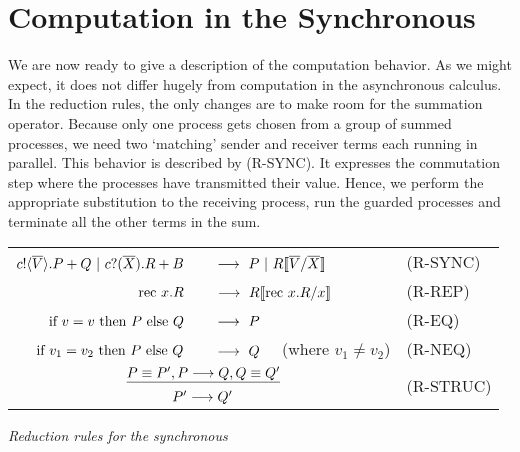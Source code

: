 \section{Computation in the Synchronous \Picalc}
We are now ready to give a description of the computation behavior.  
As we might expect, it does not differ hugely from computation in the asynchronous calculus.  
In the reduction rules, the only changes are to make room for the summation operator.
Because only one process gets chosen from a group of summed processes, we need two `matching' sender and receiver terms each running in parallel.  This behavior is described by (R-SYNC).  
It expresses the commutation step where the processes have transmitted their value.  Hence, we perform the appropriate substitution to the receiving process, run the guarded processes and terminate all the other terms in the sum.
\begin{insettable}
\begin{center}\begin{tabular}{rll}
	${c}!\langle{ \ensuremath{\overline{V}} }\rangle. P + Q \ |\  {c}?({\overline{X}}).R + B$\ &\  $\longrightarrow\  P \ |\  R\llbracket{ \ensuremath{\overline{V}} }/{\overline{X}}\rrbracket$ & \tiny{(R-SYNC)}\\
	$\text{rec }{x}.R$\ &\  $\longrightarrow\  R\llbracket{ \ensuremath{\text{rec }{x}.} R}/{x}\rrbracket$ & \tiny{(R-REP)}\\
	$\text{if } {v = v}\text{ then } P \text{ else } Q$\ &\ $\pred\ P$ & \tiny{(R-EQ)}\\
	$\text{if } {v_1 = v_2}\text{ then } P \text{ else } Q$\ &\ $\pred\ Q$ \ \ (where $v_1\neq v_2$)& \tiny{(R-NEQ)}\\
	\multicolumn{2}{c}{\hspace{4.5em}$\underline{P\equiv P', P \longrightarrow Q, Q\equiv Q'}$} & \multirow{2}{*}{\tiny{(R-STRUC)}}\\
	\multicolumn{2}{c}{\hspace{4.5em}$P'\longrightarrow Q'$}
\end{tabular}
\caption{\emph{Reduction rules for the synchronous \picalc}}\label{spireducs}
\end{center}
\end{insettable}


